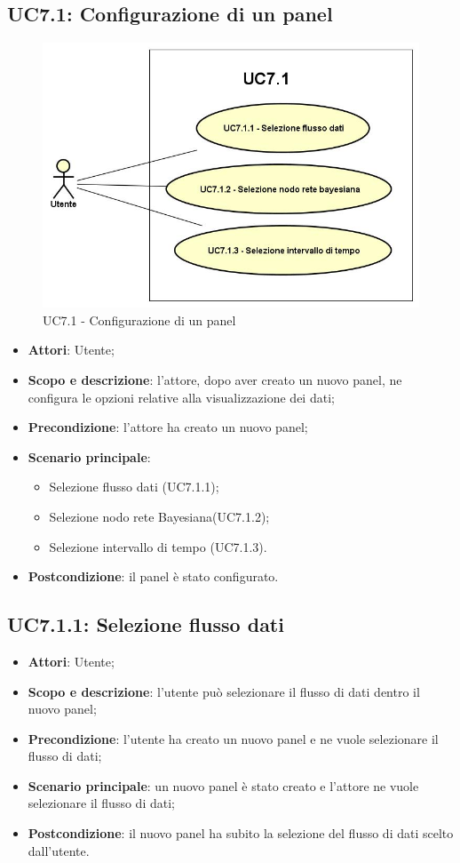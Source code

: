 \subsection{UC7.1: Configurazione di un panel}
\hypertarget{UC7.1}{}
\begin{figure} [H]
	\centering
	\includegraphics[scale=0.45]{Img/UC7-1}
	\caption{UC7.1 - Configurazione di un panel}\label{}
\end{figure}
\begin{itemize}
	\item \textbf{Attori}: Utente;
	\item \textbf{Scopo e descrizione}: l'attore, dopo aver creato un nuovo panel, ne configura le opzioni relative alla visualizzazione dei dati;
	\item \textbf{Precondizione}: l'attore ha creato un nuovo panel;
	\item \textbf{Scenario principale}:
	\begin{itemize}
		\item Selezione flusso dati  (UC7.1.1);
		\item Selezione nodo rete Bayesiana(UC7.1.2);
		\item Selezione intervallo di tempo (UC7.1.3).		
	\end{itemize}
	\item \textbf{Postcondizione}: il panel è stato configurato.
\end{itemize}
\subsection{UC7.1.1: Selezione flusso dati}
\hypertarget{UC7.1.1}{}
\begin{itemize}
	\item \textbf{Attori}: Utente;
	\item \textbf{Scopo e descrizione}: l'utente può selezionare il flusso di dati dentro il nuovo panel;
	\item \textbf{Precondizione}: l'utente ha creato un nuovo panel e ne vuole selezionare il flusso di dati;
	\item \textbf{Scenario principale}: un nuovo panel è stato creato e l'attore ne vuole selezionare il flusso di dati;
	\item \textbf{Postcondizione}: il nuovo panel ha subito la selezione del flusso di dati scelto dall'utente.
\end{itemize}
